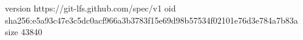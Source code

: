 version https://git-lfs.github.com/spec/v1
oid sha256:e5a93c47e3c5dc0acf966a3b3783f15e69d98b57534f02101e76d3e784a7b83a
size 43840
